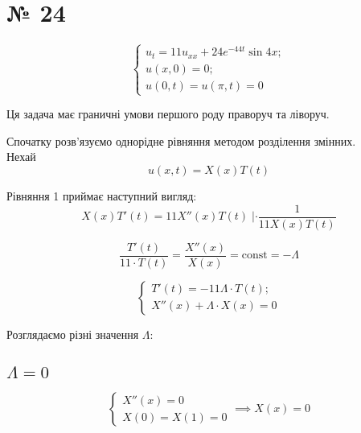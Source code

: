 \documentclass[11pt, a4paper]{article} %
\begin{document}

\section*{№ 24}

\begin{mdframed}
    \begin{equation}
        \begin{cases}
            u_t=11u_{xx} + 24e^{-44t}\sin 4x;\\
            u(x,0) = 0;\\
            u(0,t) = u(\pi,t) = 0
        \end{cases}    
    \end{equation}
\end{mdframed}

\begin{mdframed}[backgroundcolor=violet!25]
    Ця задача має граничні умови першого роду праворуч та ліворуч.
\end{mdframed}

Спочатку розв'язуємо однорідне рівняння методом розділення змінних.\\
Нехай
\begin{equation}
    u(x,t) = X(x)T(t)
\end{equation}

Рівняння 1 приймає наступний вигляд:
\begin{equation}
    X(x) T'(t) = 11 X''(x) T(t) \; | \cdot \frac{1}{11 X(x)T(t)}
\end{equation}

\begin{equation}
    \frac{T'(t)}{11\cdot T(t)} = \frac{X''(x)}{X(x)} = \text{const} = -\Lambda
\end{equation}

\begin{equation}
    \begin{cases}
        T'(t) = -11\Lambda\cdot T(t);\\
        X''(x) + \Lambda \cdot X(x) = 0
    \end{cases}
\end{equation}

Розглядаємо різні значення $\Lambda$:

\subsection*{$\Lambda=0$}
\begin{equation}
    \begin{cases}
        X''(x) = 0\\
        X(0) = X(1) = 0
    \end{cases} \implies X(x) = 0
\end{equation}
\end{document}
